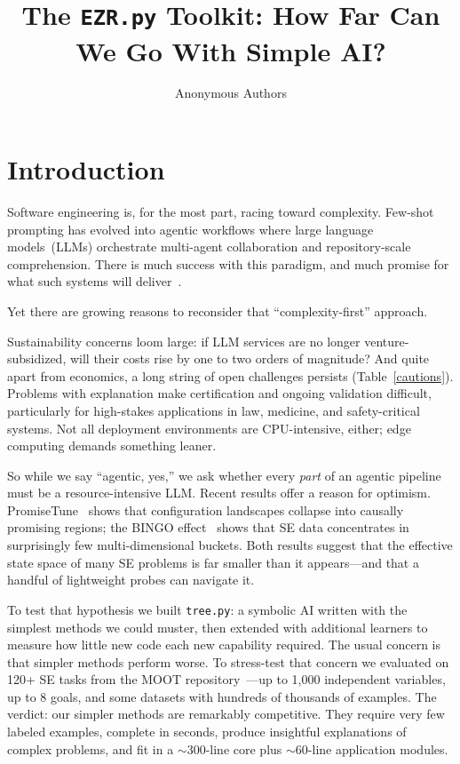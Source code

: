 \documentclass[AMA,STIX2COL]{WileyNJDv5}
\begin{document}
\title{The \texttt{EZR.py} Toolkit: How Far Can We Go
       With Simple AI?}
\author{Anonymous Authors}

\maketitle

\section{Introduction}\label{sec:intro}

Software engineering is, for the most part, racing toward
complexity. Few-shot prompting has evolved into agentic
workflows where large language models~(LLMs) orchestrate
multi-agent collaboration and repository-scale
comprehension. There is much success with this paradigm,
and much promise for what such systems will
deliver~\cite{ma2023scope,wang2022machine,%
Dong2025SurveyCodeAgents,DBLP:journals/corr/abs-2507-15003}.


Yet there are growing reasons to reconsider that ``complexity-first'' approach.

Sustainability
concerns loom large: if LLM services are no longer
venture-subsidized, will their costs rise by one to two
orders of magnitude? And quite apart from economics, a
long string of open challenges persists (Table~\ref{cautions}).
Problems with explanation make certification and ongoing
validation difficult, particularly for high-stakes
applications in law, medicine, and safety-critical systems.
Not all deployment environments are CPU-intensive, either;
edge computing demands something leaner.

So while we say ``agentic, yes,'' we ask whether every
\emph{part} of an agentic pipeline must be a
resource-intensive LLM. Recent results offer a reason for
optimism. PromiseTune~\cite{chen2026promisetune} shows that
configuration landscapes collapse into causally promising
regions; the BINGO effect~\cite{ganguly2025lowgodatalightse}
shows that SE data concentrates in surprisingly few
multi-dimensional buckets. Both results suggest that the
effective state space of many SE problems is far smaller
than it appears---and that a handful of lightweight probes
can navigate it.

To test that hypothesis we built \texttt{tree.py}: a
symbolic AI written with the simplest methods we could
muster, then extended with additional learners to measure
how little new code each new capability required. The usual
concern is that simpler methods perform worse. To stress-test
that concern we evaluated on 120+ SE tasks from the MOOT
repository~\cite{menzies2026moot}---up to 1,000 independent
variables, up to 8 goals, and some datasets with hundreds
of thousands of examples. The verdict: our simpler methods
are remarkably competitive. They require very few labeled
examples, complete in seconds, produce insightful
explanations of complex problems, and fit in a $\sim$300-line
core plus $\sim$60-line application modules.
\end{document}
